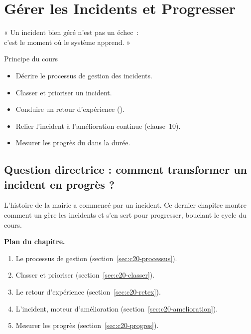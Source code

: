 
\chapter{Gérer les Incidents et Progresser}
\label{chap:incidents}

\epigraph{%
    « Un incident bien géré n'est pas un échec~:\\
    c'est le moment où le système apprend. »%
}{Principe du cours}


\begin{boxobjectifs}
\begin{itemize}
    \item Décrire le processus de gestion des incidents.
    \item Classer et prioriser un incident.
    \item Conduire un retour d'expérience ().
    \item Relier l'incident à l'amélioration continue (clause~10).
    \item Mesurer les progrès du  dans la durée.
\end{itemize}
\end{boxobjectifs}

\bigskip

\section*{Question directrice : comment transformer un incident en progrès ?}

L'histoire de la mairie a commencé par un incident. Ce dernier chapitre montre
comment un  gère les incidents et s'en sert pour progresser,
bouclant le cycle du cours.

\medskip
\textbf{Plan du chapitre.}
\begin{enumerate}
    \item Le processus de gestion (section~\ref{sec:c20-processus}).
    \item Classer et prioriser (section~\ref{sec:c20-classer}).
    \item Le retour d'expérience (section~\ref{sec:c20-retex}).
    \item L'incident, moteur d'amélioration (section~\ref{sec:c20-amelioration}).
    \item Mesurer les progrès (section~\ref{sec:c20-progres}).
\end{enumerate}

